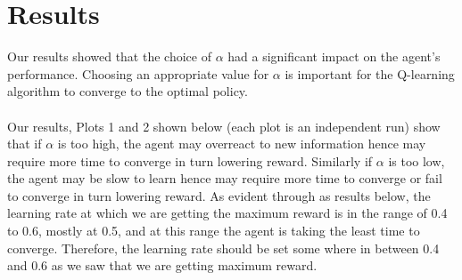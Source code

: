 \documentclass[conference]{IEEEtran}
\begin{document}
\section{Results}
Our results showed that the choice of $\alpha$ had a significant impact on the agent's performance. Choosing an appropriate value for $\alpha$ is important for the Q-learning algorithm to converge to the optimal policy. \\ \\ Our results, Plots 1 and 2 shown below (each plot is an independent run) show that if $\alpha$ is too high, the agent may overreact to new information hence may require more time to converge in turn lowering reward. Similarly if $\alpha$ is too low, the agent may be slow to learn hence may require more time to converge or fail to converge in turn lowering reward. As evident through as results below, the learning rate at which we are getting the maximum reward is in the range of 0.4 to 0.6, mostly at 0.5, and at this range the agent is taking the least time to converge. Therefore, the learning rate should be set some where in between 0.4 and 0.6 as we saw that we are getting maximum reward. 



\end{document}
